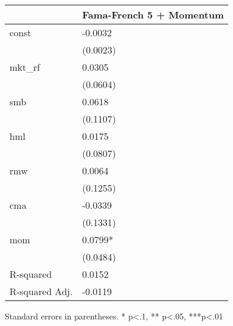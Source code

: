 \begin{table}
\caption{}
\label{}
\begin{center}
\begin{tabular}{ll}
\hline
               & Fama-French 5 + Momentum  \\
\hline
const          & -0.0032                   \\
               & (0.0023)                  \\
mkt\_rf        & 0.0305                    \\
               & (0.0604)                  \\
smb            & 0.0618                    \\
               & (0.1107)                  \\
hml            & 0.0175                    \\
               & (0.0807)                  \\
rmw            & 0.0064                    \\
               & (0.1255)                  \\
cma            & -0.0339                   \\
               & (0.1331)                  \\
mom            & 0.0799*                   \\
               & (0.0484)                  \\
R-squared      & 0.0152                    \\
R-squared Adj. & -0.0119                   \\
\hline
\end{tabular}
\end{center}
\end{table}
\bigskip
Standard errors in parentheses. \newline 
* p<.1, ** p<.05, ***p<.01